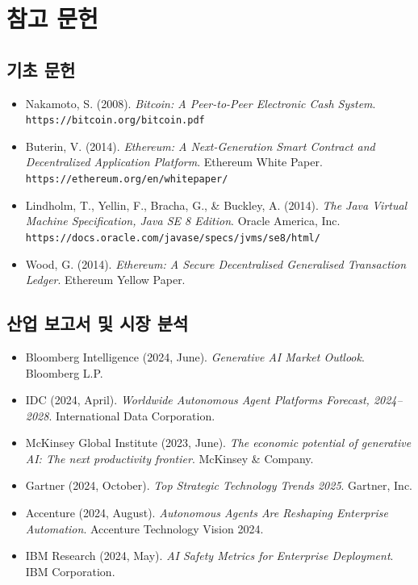 \documentclass[11pt]{article}
\begin{document}
\clearpage

\section*{참고 문헌}

\subsection*{기초 문헌}

\begin{itemize}[leftmargin=*, label={}]
  \item Nakamoto, S. (2008). \textit{Bitcoin: A Peer-to-Peer Electronic Cash System}. \texttt{https://bitcoin.org/bitcoin.pdf}

  \item Buterin, V. (2014). \textit{Ethereum: A Next-Generation Smart Contract and Decentralized Application Platform}. Ethereum White Paper. \texttt{https://ethereum.org/en/whitepaper/}

  \item Lindholm, T., Yellin, F., Bracha, G., \& Buckley, A. (2014). \textit{The Java Virtual Machine Specification, Java SE 8 Edition}. Oracle America, Inc. \texttt{https://docs.oracle.com/javase/specs/jvms/se8/html/}

  \item Wood, G. (2014). \textit{Ethereum: A Secure Decentralised Generalised Transaction Ledger}. Ethereum Yellow Paper.
\end{itemize}

\subsection*{산업 보고서 및 시장 분석}

\begin{itemize}[leftmargin=*, label={}]
  \item Bloomberg Intelligence (2024, June). \textit{Generative AI Market Outlook}. Bloomberg L.P.

  \item IDC (2024, April). \textit{Worldwide Autonomous Agent Platforms Forecast, 2024--2028}. International Data Corporation.

  \item McKinsey Global Institute (2023, June). \textit{The economic potential of generative AI: The next productivity frontier}. McKinsey \& Company.

  \item Gartner (2024, October). \textit{Top Strategic Technology Trends 2025}. Gartner, Inc.

  \item Accenture (2024, August). \textit{Autonomous Agents Are Reshaping Enterprise Automation}. Accenture Technology Vision 2024.

  \item IBM Research (2024, May). \textit{AI Safety Metrics for Enterprise Deployment}. IBM Corporation.
\end{itemize}
\end{document}

